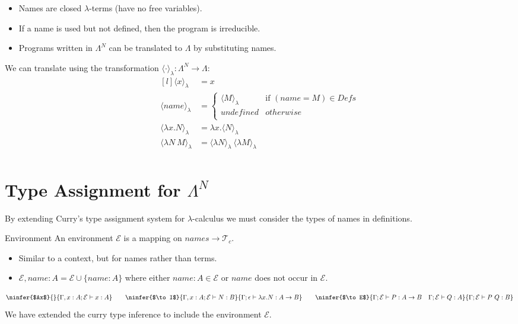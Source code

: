 \begin{itemize}
    \item Names are closed $\lambda$-terms (have no free variables).
    \item If a name is used but not defined, then the program is irreducible.
    \item Programs written in $\Lambda^N$ can be translated to $\Lambda$ by substituting names.
\end{itemize}
We can translate using the transformation $\langle \cdot \rangle_\lambda : \Lambda^N \to \Lambda$:
\[\begin{matrix*}[l]
    \langle x \rangle_\lambda & = x \\
    \langle name \rangle_\lambda & = \begin{cases}
        \langle M \rangle_\lambda & \text{if } (name = M) \in Defs \\
        undefined & otherwise \\
    \end{cases} \\
    \langle \lambda x . N \rangle_\lambda & = \lambda x . \langle N \rangle_\lambda \\
    \langle \lambda N \ M \rangle_\lambda & = \langle \lambda N \rangle_\lambda \ \langle \lambda M \rangle_\lambda \\
\end{matrix*}\]

\section{Type Assignment for $\Lambda^N$}
By extending Curry's type assignment system for $\lambda$-calculus we must consider the types of names in definitions.
\begin{definitionbox}{Environment}
    An environment $\mathcal{E}$ is a mapping on $names \to \mathcal{T}_c$.
    \begin{itemize}
        \item Similar to a context, but for names rather than terms.
        \item $\mathcal{E}, name:A = \mathcal{E} \cup \{ name: A \}$ where either $name : A \in \mathcal{E}$ or $name$ does not occur in $\mathcal{E}$.
    \end{itemize}
\end{definitionbox}

\[\ninfer{$Ax$}{}{\Gamma, x:A; \mathcal{E} \vdash x : A} 
\qquad \ninfer{$\to I$}{\Gamma, x:A ; \mathcal{E} \vdash N : B}{\Gamma ; \epsilon \vdash \lambda x . N : A \to B}
\qquad \ninfer{$\to E$}{\Gamma; \mathcal{E} \vdash P : A \to B \quad \Gamma ; \mathcal{E} \vdash Q : A}{\Gamma ; \mathcal{E} \vdash P \ Q : B}\]
We have extended the curry type inference to include the environment $\mathcal{E}$.

